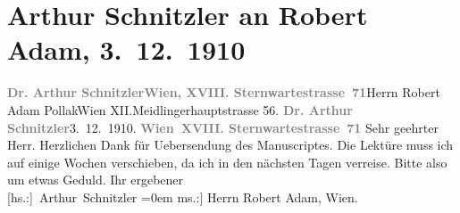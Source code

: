 

         
         \renewcommand{\erwaehntePersonen}{Personen: Robert Adam}
         \renewcommand{\erwaehnteOrte}{Orte: IX., Alsergrund, Meidlinger Hauptstraße, Sternwartestraße 71, Wien, XII., Meidling}
         \renewcommand{\erwaehnteWerke}{Werke: Neidhard}
               \section[Arthur Schnitzler an Robert Adam, 3. 12. 1910]{ Arthur Schnitzler an Robert Adam, 3. 12. 1910}\nopagebreak{}\rehead{ }\begin{ledgroupsized}[t]{13cm}\normalsize\beginnumbering{} \toendnotes[C]{\smallbreak\pagebreak[2]} 
\toendnotes[C]{\smallbreak}\pstart{}{\pb}\textcolor{gray}{\textbf{Dr. Arthur Schnitzler}}\pend{}\pstart{}\textcolor{gray}{\textbf{Wien, XVIII. Sternwartestrasse 71}}\pend{}{\bigskip}\pstart{}{\pb}Herrn Robert Adam Pollak\pend{}\pstart{}Wien XII.\pend{}\pstart{}Meidlingerhauptstrasse 56.\pend{}{\bigskip}\pstart
           {\pb}\textcolor{gray}{\textbf{Dr. Arthur Schnitzler}}\hfill 3. 12. 1910.\pend
           \pstart
           \textcolor{gray}{\textbf{Wien XVIII. Sternwartestrasse 71}}\pend
           \pstart\center{}Sehr geehrter Herr.\pend\pstart
           Herzlichen Dank für Uebersendung des Manuscriptes. Die Lektüre muss ich auf einige Wochen
               verschieben, da ich in den nächsten Tagen verreise. Bitte also um etwas Geduld.\pend
           \pstart
           Ihr ergebener{\\[\baselineskip]}\spacefill\mbox{{[}hs.:{]} Arthur Schnitzler}\pend
           \leftskip=0em{}\pstart
           \noindent{}{[}ms.:{]} Herrn Robert Adam, Wien.\pend
           
         
         \endnumbering{}\end{ledgroupsized}  \newcommand{\dateiname}{L01990}\newcommand{\titel}{Arthur Schnitzler an Robert Adam, 3. 12. 1910}\newcommand{\editorInnen}{Martin Anton Müller und Gerd-Hermann Susen}
      